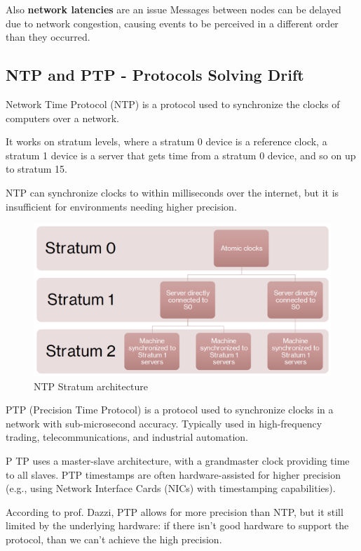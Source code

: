Also \textbf{network latencies} are an issue
Messages between nodes can be delayed due to network congestion, causing events to be perceived in a different order than they occurred.

\subsection{NTP and PTP - Protocols Solving Drift}
\begin{paracol}{2}
   Network Time Protocol (NTP) is a protocol used to synchronize the clocks of computers over a network.

   It works on stratum levels, where a stratum 0 device is a reference clock, a stratum 1 device is a server that gets time from a stratum 0 device, and so on up to stratum 15.
   
   NTP can synchronize clocks to within milliseconds over the internet, but it is insufficient for environments needing higher precision.
   \switchcolumn
   \begin{figure}[htbp]
      \centering
      \includegraphics{images/03/ntp.png}
      \caption{NTP Stratum architecture}
      \label{fig:03/ntp}
   \end{figure}
\end{paracol}

PTP (Precision Time Protocol) is a protocol used to synchronize clocks in a network with sub-microsecond accuracy. Typically used in high-frequency trading, telecommunications, and industrial automation.

P TP uses a master-slave architecture, with a grandmaster clock providing time to all slaves.
PTP timestamps are often hardware-assisted for higher precision (e.g., using Network Interface Cards (NICs) with timestamping capabilities).

According to prof. Dazzi, PTP allows for more precision than NTP, but it still limited by the underlying hardware: if there isn't good hardware to support the protocol, than we can't achieve the high precision.

